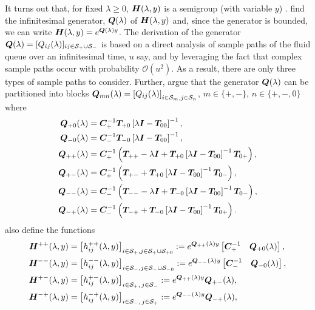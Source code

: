 It turns out that, for fixed \(\lambda \geq 0\), \(\boldsymbol H (\lambda,y)\) is a semigroup (with variable \(y\)) \citep{bean2005}. \cite{bean2005} find the infinitesimal generator, \(\boldsymbol Q(\lambda)\) of \(\boldsymbol H(\lambda,y)\) and, since the generator is bounded, we can write \(\boldsymbol H(\lambda,y)=e^{\boldsymbol Q(\lambda)y}\). The derivation of the generator \(\boldsymbol Q(\lambda)=[Q_{ij}(\lambda)]_{ij\in\mathcal{S}_+\cup\mathcal{S}_-}\) is based on a direct analysis of sample paths of the fluid queue over an infinitesimal time, \(u\) say, and by leveraging the fact that complex sample paths occur with probability \(\mathcal O(u^2)\). As a result, there are only three types of sample paths to consider. Further, \cite{bean2005} argue that the generator \(\boldsymbol Q(\lambda)\) can be partitioned into blocks \(\boldsymbol Q_{mn}(\lambda) = \left[Q_{ij}(\lambda)\right]_{i\in\mathcal{S}_m,j\in\mathcal{S}_n}\), \(m\in\{+,-\},\,n\in\{+,-,0\}\) where 
\begin{align*}
	\boldsymbol Q_{+0}(\lambda) &= \boldsymbol C_+^{-1}\boldsymbol T_{+0}\left[\lambda \boldsymbol I - \boldsymbol T_{00}\right]^{-1},
	\\\boldsymbol Q_{-0}(\lambda) &= \boldsymbol C_-^{-1}\boldsymbol T_{-0}\left[\lambda \boldsymbol I - \boldsymbol T_{00}\right]^{-1},
	\\\boldsymbol Q_{++}(\lambda) &= \boldsymbol C_+^{-1} \left(\boldsymbol T_{++} - \lambda \boldsymbol I + \boldsymbol T_{+0}\left[\lambda \boldsymbol I - \boldsymbol T_{00}\right]^{-1}\boldsymbol T_{0+}\right),
	\\\boldsymbol Q_{+-}(\lambda) &= \boldsymbol C_+^{-1} \left(\boldsymbol T_{+-} + \boldsymbol T_{+0}\left[\lambda \boldsymbol I - \boldsymbol T_{00}\right]^{-1}\boldsymbol T_{0-} \right) ,
	\\\boldsymbol Q_{--}(\lambda) &= \boldsymbol C_-^{-1} \left(\boldsymbol T_{--}  - \lambda \boldsymbol I + \boldsymbol T_{-0}\left[\lambda \boldsymbol I - \boldsymbol T_{00}\right]^{-1}\boldsymbol T_{0-}\right),
	\\\boldsymbol Q_{-+}(\lambda) &=\boldsymbol C_-^{-1} \left(\boldsymbol T_{-+}+ \boldsymbol T_{-0}\left[\lambda \boldsymbol I - \boldsymbol T_{00}\right]^{-1}\boldsymbol T_{0+}\right).
\end{align*}
\cite{bean2005} also define the functions 
\begin{align}
	\boldsymbol H^{++}(\lambda,y)&= \left[h_{ij}^{++}(\lambda,y)\right]_{i\in \mathcal S_+,j\in\mathcal S_{+}\cup\mathcal{S}_{+0}} := e^{\boldsymbol{Q}_{++}(\lambda)y}\begin{bmatrix} \boldsymbol C_+^{-1} & \boldsymbol Q_{+0}(\lambda) \end{bmatrix},  \label{eqn: lst 1a}
	\\\boldsymbol H^{--}(\lambda,y) &= \left[h_{ij}^{--}(\lambda,y)\right]_{i\in\mathcal S_-,j\in\mathcal S_{-}\cup\mathcal{S}_{-0}}:= e^{\boldsymbol{Q}_{--}(\lambda)y}\begin{bmatrix} \boldsymbol C_-^{-1} & \boldsymbol Q_{-0}(\lambda) \end{bmatrix},
	\\\boldsymbol H^{+-}(\lambda,y)  &= \left[h_{ij}^{+-}(\lambda,y)\right]_{i\in\mathcal S_+,\,j\in\mathcal S_-}:= e^{\boldsymbol{Q}_{++}(\lambda)y}\boldsymbol{Q}_{+-}(\lambda), 
	\\\boldsymbol H^{-+}(\lambda,y)&= \left[h_{ij}^{-+}(\lambda,y)\right]_{i\in\mathcal S_-,\, j\in\mathcal S_+} := e^{\boldsymbol{Q}_{--}(\lambda)y}\boldsymbol{Q}_{-+}(\lambda), \label{eqn: lst 4a}
\end{align}
